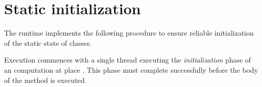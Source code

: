\section{Static initialization}
\label{StaticInitialization}
The \Xten{} runtime implements the following procedure to ensure
reliable initialization of the static state of classes.


Execution commences with a single thread executing the
\emph{initialization} phase of an \Xten{} computation at place . This
phase must complete successfully before the body of the  method is
executed.

